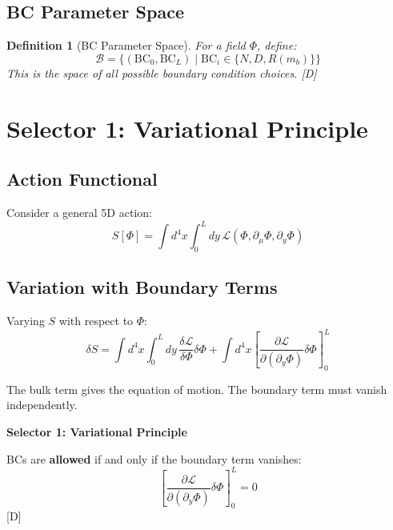 \documentclass[11pt,a4paper]{article}
\newtheorem{definition}[theorem]{Definition}
\newcommand{\tagD}{\textcolor{blue!70!black}{[D]}}
\begin{document}
\subsection{BC Parameter Space}

\begin{definition}[BC Parameter Space]
\label{def:bc-space}
For a field $\Phi$, define:
\begin{equation}
\label{eq:bc-space}
\mathcal{B} = \{(\text{BC}_0, \text{BC}_L) \mid \text{BC}_i \in \{N, D, R(m_b)\}\}
\end{equation}
This is the space of all possible boundary condition choices. \tagD
\end{definition}

\section{Selector 1: Variational Principle}

\subsection{Action Functional}

Consider a general 5D action:
\begin{equation}
\label{eq:5d-action}
S[\Phi] = \int d^4x \int_0^L dy \, \mathcal{L}(\Phi, \partial_\mu \Phi, \partial_y \Phi)
\end{equation}

\subsection{Variation with Boundary Terms}

Varying $S$ with respect to $\Phi$:
\begin{equation}
\label{eq:variation}
\delta S = \int d^4x \int_0^L dy \, \frac{\delta \mathcal{L}}{\delta \Phi} \delta\Phi
+ \int d^4x \left[ \frac{\partial \mathcal{L}}{\partial(\partial_y \Phi)} \delta\Phi \right]_0^L
\end{equation}

The bulk term gives the equation of motion. The boundary term must vanish independently.

\begin{selectorbox}
\textbf{Selector 1: Variational Principle}

BCs are \textbf{allowed} if and only if the boundary term vanishes:
\begin{equation}
\label{eq:var-selector}
\boxed{\left[ \frac{\partial \mathcal{L}}{\partial(\partial_y \Phi)} \delta\Phi \right]_0^L = 0}
\end{equation}
\tagD
\end{selectorbox}
\end{document}
